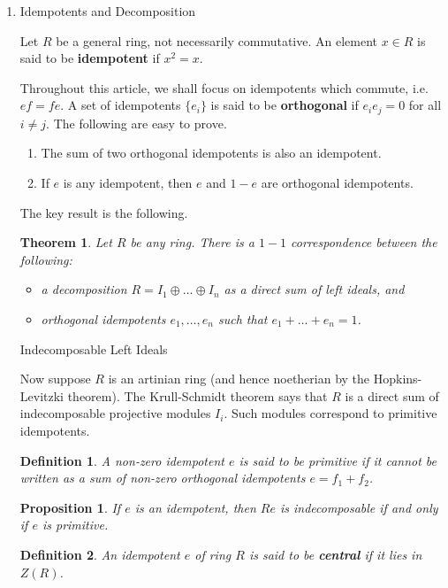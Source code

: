 \documentclass[UTF8]{ctexart}
\newtheorem*{prop}{Proposition}
\newtheorem*{defi}{Definition}
\newtheorem*{thm}{Theorem}
\begin{document}
\begin{enumerate}
\item Idempotents and Decomposition\cite{idempotents-and-decomposition}

Let $R$ be a general ring, not necessarily commutative. An element $x\in R$ is said to be \textbf{idempotent} if $x^2 = x$.

Throughout this article, we shall focus on idempotents which commute, i.e. $ef = fe$. A set of idempotents $\{e_i\}$ is said to be \textbf{orthogonal} if $e_{i}e_{j} = 0$ for all $i \neq j$. The following are easy to prove.

\begin{enumerate}
  \item The sum of two orthogonal idempotents is also an idempotent.
  \item If $e$ is any idempotent, then $e$ and $1-e$ are orthogonal idempotents.
\end{enumerate}

The key result is the following.

\begin{thm}
Let $R$ be any ring. There is a $1-1$ correspondence between the following:

\begin{itemize}
  \item a decomposition $R = I_1 \oplus \ldots \oplus I_n$ as a direct sum of left ideals, and
  \item orthogonal idempotents $e_1,\ldots,e_n$ such that $e_1 + \ldots + e_n = 1$.
\end{itemize}

\end{thm}

Indecomposable Left Ideals

Now suppose $R$ is an artinian ring (and hence noetherian by the Hopkins-Levitzki theorem). The Krull-Schmidt theorem says that $R$ is a direct sum of indecomposable projective modules $I_i$. Such modules correspond to primitive idempotents.
\begin{defi}
A non-zero idempotent $e$ is said to be \textit{primitive} if it cannot be written as a sum of non-zero orthogonal idempotents $e = f_1 + f_2$.
\end{defi}
\begin{prop}
If $e$ is an idempotent, then $Re$ is indecomposable if and only if $e$ is primitive.
\end{prop}

\begin{defi}
An idempotent $e$ of ring $R$ is said to be \textbf{central} if it lies in $Z(R)$.
\end{defi}


\end{enumerate}
\end{document}
